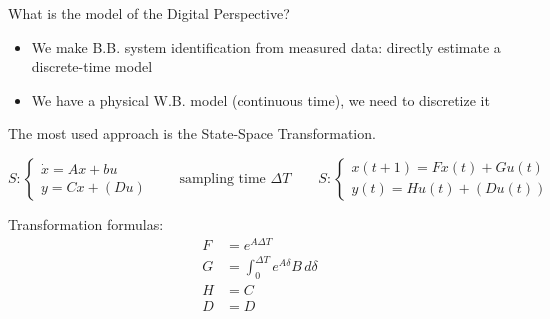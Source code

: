 What is the model of the Digital Perspective?

\begin{figure}[H]
    \centering
\end{figure}

\begin{itemize}
    \item We make B.B. system identification from measured data: directly estimate a discrete-time model
    \item We have a physical W.B. model (continuous time), we need to discretize it
\end{itemize}

The most used approach is the State-Space Transformation.

\[
    S: \begin{cases}
        \dot{x} = Ax + bu \\
        y = Cx + (Du)
    \end{cases}
    \qquad
    \text{sampling time $\Delta T$}
    \qquad
    S: \begin{cases}
        x(t+1) = Fx(t) + Gu(t) \\
        y(t) = Hu(t) + (Du(t))
    \end{cases}
\]

Transformation formulas:
\begin{align*}
    F &= e^{A\Delta T} \\
    G &= \int_0^{\Delta T} e^{A\delta}B\, d\delta \\
    H &= C \\
    D &= D
\end{align*}

